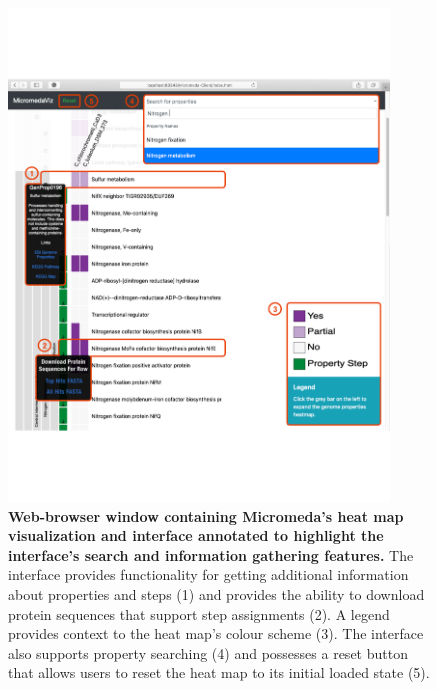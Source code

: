 \begin{figure}[!ht]
  \centering
	\includegraphics[width=0.9\textwidth]{media/micromeda-interface.pdf}
	 \caption[Web-browser window containing Micromeda’s heat map visualization and 
interface annotated to highlight the interface’s search and information 
gathering features.]{\textbf{Web-browser window containing Micromeda’s heat map 
visualization and interface annotated to highlight the interface’s search and 
information gathering features.} The interface provides functionality for getting 
additional information about properties and steps (1) and provides the ability 
to download protein sequences that support step assignments (2). A legend 
provides context to the heat map’s colour scheme (3). The interface also 
supports property searching (4) and possesses a reset button that allows users 
to reset the heat map to its initial loaded state (5).}
	 \label{fig:micromeda-interface}
\end{figure}

